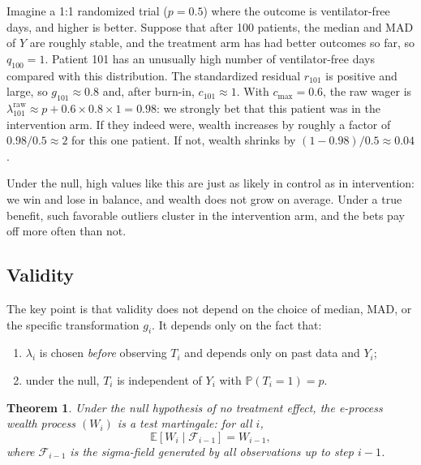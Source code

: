 \documentclass[10pt]{article}
\newtheorem{theorem}{Theorem}
\begin{document}
Imagine a 1:1 randomized trial ($p=0.5$) where the outcome is ventilator-free days, and higher is better. Suppose that after 100 patients, the median and MAD of $Y$ are roughly stable, and the treatment arm has had better outcomes so far, so $q_{100}=1$. Patient 101 has an unusually high number of ventilator-free days compared with this distribution. The standardized residual $r_{101}$ is positive and large, so $g_{101} \approx 0.8$ and, after burn-in, $c_{101} \approx 1$. With $c_{\max} = 0.6$, the raw wager is $\lambda_{101}^{\mathrm{raw}} \approx p + 0.6 \times 0.8 \times 1 = 0.98$: we strongly bet that this patient was in the intervention arm. If they indeed were, wealth increases by roughly a factor of $0.98/0.5 \approx 2$ for this one patient. If not, wealth shrinks by $(1-0.98)/0.5 \approx 0.04$.

Under the null, high values like this are just as likely in control as in intervention: we win and lose in balance, and wealth does not grow on average. Under a true benefit, such favorable outliers cluster in the intervention arm, and the bets pay off more often than not.

\subsection{Validity}

The key point is that validity does not depend on the choice of median, MAD, or the specific transformation $g_i$. It depends only on the fact that:
\begin{enumerate}
    \item $\lambda_i$ is chosen \emph{before} observing $T_i$ and depends only on past data and $Y_i$;
    \item under the null, $T_i$ is independent of $Y_i$ with $\mathbb{P}(T_i = 1) = p$.
\end{enumerate}

\begin{theorem}
Under the null hypothesis of no treatment effect, the e-process wealth process $(W_i)$ is a test martingale: for all $i$,
\[
\mathbb{E}[W_i \mid \mathcal{F}_{i-1}] = W_{i-1},
\]
where $\mathcal{F}_{i-1}$ is the sigma-field generated by all observations up to step $i-1$.
\end{theorem}
\end{document}
